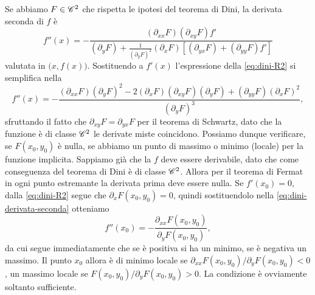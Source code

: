 Se abbiamo $F\in\cclass[2]$ che rispetta le ipotesi del teorema di Dini, la derivata seconda di $f$ è
\begin{equation}
	f''(x)=-\frac{(\partial_{xx}F)(\partial_{xy}F)f'}{(\partial_yF)+\frac1{(\partial_yF)^2}(\partial_xF)[(\partial_{yx}F)+(\partial_{yy}F)f']}
\end{equation}
valutata in $\big(x,f(x)\big)$. Sostituendo a $f'(x)$ l'espressione della \eqref{eq:dini-R2} si semplifica nella
\begin{equation} 
	f''(x)=-\frac{(\partial_{xx}F)(\partial_yF)^2-2(\partial_xF)(\partial_{xy}F)(\partial_yF)+(\partial_{yy}F)(\partial_xF)^2}{(\partial_yF)^3},
	\label{eq:dini-derivata-seconda}
\end{equation}
sfruttando il fatto che $\partial_{xy}F=\partial_{yx}F$ per il teorema di Schwartz, dato che la funzione è di classe $\cclass[2]$ le derivate miste coincidono.
Possiamo dunque verificare, se $F(x_0,y_0)$ è nulla, se abbiamo un punto di massimo o minimo (locale) per la funzione implicita.
Sappiamo già che la $f$ deve essere derivabile, dato che come conseguenza del teorema di Dini è di classe $\cclass[2]$.
Allora per il teorema di Fermat in ogni punto estremante la derivata prima deve essere nulla.
Se $f'(x_0)=0$, dalla \eqref{eq:dini-R2} segue che $\partial_xF(x_0,y_0)=0$, quindi sostituendolo nella \eqref{eq:dini-derivata-seconda} otteniamo
\begin{equation} 
	f''(x_0)=-\frac{\partial_{xx}F(x_0,y_0)}{\partial_yF(x_0,y_0)},
	\label{eq:derivata-seconda-semplificata-dini}
\end{equation}
da cui segue immediatamente che se è positiva si ha un minimo, se è negativa un massimo.
Il punto $x_0$ allora è di minimo locale se $\partial_{xx}F(x_0,y_0)/\partial_yF(x_0,y_0)<0$, un massimo locale se $F(x_0,y_0)/\partial_yF(x_0,y_0)>0$.
La condizione è ovviamente soltanto sufficiente.

